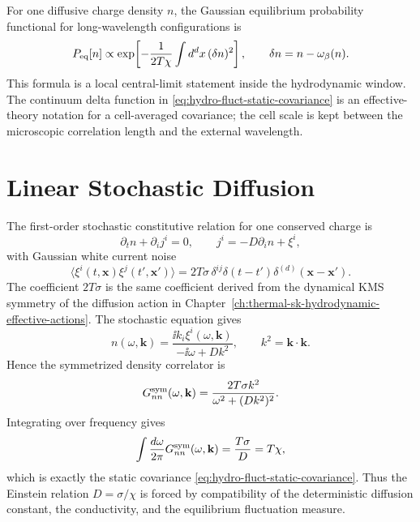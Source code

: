 For one diffusive charge density \(n\), the Gaussian equilibrium
probability functional for long-wavelength configurations is
\begin{equation}
  P_{\rm eq}[n]\propto
  \exp\!\left[
    -\frac{1}{2T\chi}\int d^dx\,(\delta n)^2
  \right],
  \qquad
  \delta n=n-\omega_\beta(n).
  \label{eq:hydro-fluct-static-gaussian}
\end{equation}
This formula is a local central-limit statement inside the hydrodynamic
window.  The continuum delta function in
\eqref{eq:hydro-fluct-static-covariance} is an effective-theory notation for
a cell-averaged covariance; the cell scale is kept between the microscopic
correlation length and the external wavelength.

\section{Linear Stochastic Diffusion}

The first-order stochastic constitutive relation for one conserved charge is
\begin{equation}
  \partial_t n+\partial_i j^i=0,
  \qquad
  j^i=-D\partial_i n+\xi^i,
  \label{eq:hydro-fluct-langevin-diffusion}
\end{equation}
with Gaussian white current noise
\begin{equation}
  \langle\xi^i(t,\mathbf x)\xi^j(t',\mathbf x')\rangle
  =
  2T\sigma\,\delta^{ij}
  \delta(t-t')\delta^{(d)}(\mathbf x-\mathbf x').
  \label{eq:hydro-fluct-current-noise}
\end{equation}
The coefficient \(2T\sigma\) is the same coefficient derived from the
dynamical KMS symmetry of the diffusion action in
Chapter~\ref{ch:thermal-sk-hydrodynamic-effective-actions}.  The stochastic
equation gives
\[
  n(\omega,\mathbf k)
  =
  \frac{\ii k_i\xi^i(\omega,\mathbf k)}
       {-\ii\omega+Dk^2},
  \qquad
  k^2=\mathbf k\cdot\mathbf k .
\]
Hence the symmetrized density correlator is
\begin{equation}
  G^{\rm sym}_{nn}(\omega,\mathbf k)
  =
  \frac{2T\sigma k^2}
       {\omega^2+(Dk^2)^2}.
  \label{eq:hydro-fluct-density-symmetric}
\end{equation}
Integrating over frequency gives
\[
  \int\frac{d\omega}{2\pi}
  G^{\rm sym}_{nn}(\omega,\mathbf k)
  =
  \frac{T\sigma}{D}
  =
  T\chi,
\]
which is exactly the static covariance
\eqref{eq:hydro-fluct-static-covariance}.  Thus the Einstein relation
\(D=\sigma/\chi\) is forced by compatibility of the deterministic diffusion
constant, the conductivity, and the equilibrium fluctuation measure.

